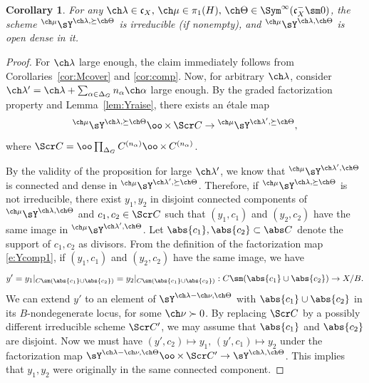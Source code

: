 \documentclass[final]{amsart}
\newtheorem{cor}[subsubsection]{Corollary}
\theoremstyle{remark}
\theoremstyle{definition}
\DeclareMathOperator*{\xt}{\times}
\numberwithin{equation}{section}
\begin{document}
\begin{cor} \label{cor:Ycomp}
For any $\ch\lambda \in \mathfrak c_X,\, \ch\mu\in \pi_1(H),\,
\ch\Theta \in \Sym^\infty(\mathfrak c_X^- \sm 0)$, the scheme 
$^{\ch\mu}\sY^{\ch\lambda,\succeq\ch\Theta}$ is irreducible (if nonempty), and $^{\ch\mu}\sY^{\ch\lambda,\ch\Theta} $ is open dense in it.
\end{cor}
\begin{proof}
For $\ch\lambda$ large enough, the claim immediately follows from
Corollaries~\ref{cor:Mcover} and \ref{cor:comp}. 
Now, for arbitrary $\ch\lambda$, consider 
$\ch\lambda'=\ch\lambda+\sum_{\alpha\in \Delta_G} n_\alpha \ch\alpha$
large enough. 
By the graded factorization property and Lemma~\ref{lem:Yraise}, 
there exists an \'etale map 
\begin{equation} \label{e:Ycomp1}
    ^{\ch\mu}\sY^{\ch\lambda,\succeq\ch\Theta} \oo\xt \Scr C \to {^{\ch\mu}}\sY^{\ch\lambda',\succeq\ch\Theta},
 \end{equation}
where $\Scr C = \oo\prod_{\Delta_G} C^{(n_\alpha)} \oo\xt C^{(n_\alpha)}$.


By the validity of the proposition for large $\ch\lambda'$,  
we know that $^{\ch\mu}\sY^{\ch\lambda',\ch\Theta}$ is 
connected and dense in $^{\ch\mu}\sY^{\ch\lambda', \succeq \ch\Theta}$.
Therefore, if $^{\ch\mu}\sY^{\ch\lambda,\succeq\ch\Theta}$ is not irreducible, 
there exist $y_1,y_2$ in disjoint connected components of 
$^{\ch\mu}\sY^{\ch\lambda,\ch\Theta}$ 
and $c_1,c_2\in \Scr C$ such that $(y_1,c_1)$ and $(y_2,c_2)$ have the same
image in $^{\ch\mu}\sY^{\ch\lambda',\ch\Theta}$.
Let $\abs{c_1}, \abs{c_2} \subset \abs C$ denote the support of $c_1,c_2$
as divisors. 
From the definition of the factorization map \eqref{e:Ycomp1}, 
if $(y_1,c_1)$ and $(y_2,c_2)$ have the same image, 
we have 
\[ y' = y_1 |_{C \sm (\abs{c_1}\cup \abs{c_2})} = y_2 |_{C\sm (\abs{c_1}\cup \abs{c_2})} : C \sm (\abs{c_1}\cup \abs{c_2}) \to X/B. \] 
We can extend $y'$ to an element of $\sY^{\ch\lambda-\ch\nu, \ch\Theta}$
with $\abs{c_1}\cup \abs{c_2}$ in its $B$-nondegenerate locus, 
for some $\ch\nu\succ 0$. 
By replacing $\Scr C$ by a possibly different irreducible scheme $\Scr C'$,
we may assume that $\abs{c_1}$ and $\abs{c_2}$ are disjoint. 
Now we must have $(y', c_2) \mapsto y_1,\, (y',c_1)\mapsto y_2$ under
the factorization map 
$\sY^{\ch\lambda-\ch\nu,\ch\Theta} \oo\xt \Scr C' \to \sY^{\ch\lambda,\ch\Theta}$.
This implies that $y_1,y_2$ were originally in the same connected component.
\end{proof}
\end{document}
